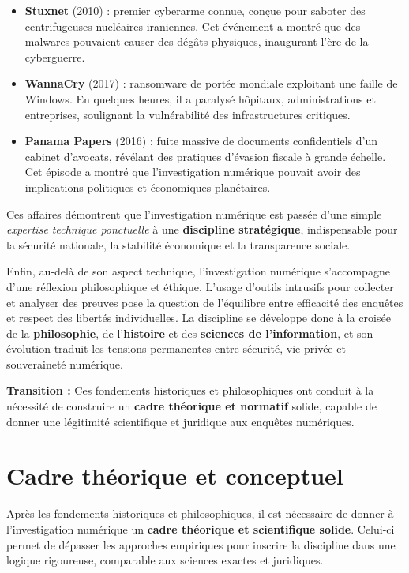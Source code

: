 \documentclass[memoire, 12pt]{report}
\begin{document}
\begin{itemize}
  \item \textbf{Stuxnet} (2010) : premier cyberarme connue, conçue pour saboter des centrifugeuses nucléaires iraniennes. 
  Cet événement a montré que des malwares pouvaient causer des dégâts physiques, 
  inaugurant l’ère de la cyberguerre.  

  \item \textbf{WannaCry} (2017) : ransomware de portée mondiale exploitant une faille 
  de Windows. En quelques heures, il a paralysé hôpitaux, administrations et entreprises, 
  soulignant la vulnérabilité des infrastructures critiques.  

  \item \textbf{Panama Papers} (2016) : fuite massive de documents confidentiels d’un cabinet d’avocats, 
  révélant des pratiques d’évasion fiscale à grande échelle. 
  Cet épisode a montré que l’investigation numérique pouvait avoir des implications 
  politiques et économiques planétaires.  
\end{itemize}

Ces affaires démontrent que l’investigation numérique est passée d’une simple 
\emph{expertise technique ponctuelle} à une \textbf{discipline stratégique}, 
indispensable pour la sécurité nationale, la stabilité économique et la transparence sociale.  

Enfin, au-delà de son aspect technique, l’investigation numérique s’accompagne d’une réflexion philosophique et éthique. 
L’usage d’outils intrusifs pour collecter et analyser des preuves pose la question de l’équilibre 
entre efficacité des enquêtes et respect des libertés individuelles. 
La discipline se développe donc à la croisée de la \textbf{philosophie}, de l’\textbf{histoire} 
et des \textbf{sciences de l’information}, et son évolution traduit les tensions permanentes 
entre sécurité, vie privée et souveraineté numérique.  

\textbf{Transition :} Ces fondements historiques et philosophiques ont conduit 
à la nécessité de construire un \textbf{cadre théorique et normatif} solide, 
capable de donner une légitimité scientifique et juridique aux enquêtes numériques.  


\section*{Cadre théorique et conceptuel}

Après les fondements historiques et philosophiques, il est nécessaire de donner 
à l’investigation numérique un \textbf{cadre théorique et scientifique solide}. 
Celui-ci permet de dépasser les approches empiriques pour inscrire la discipline 
dans une logique rigoureuse, comparable aux sciences exactes et juridiques.  
\end{document}

